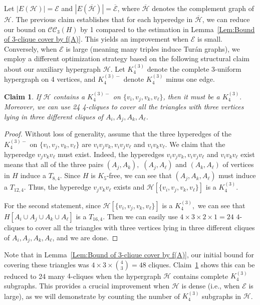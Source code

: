 \documentclass[11pt,a4paper]{article}
\newtheorem{clm}[dfn]{Claim}
\newcommand{\dH}{{\mathcal{H}}}
\newcommand{\dE}{{\mathcal{E}}}
\newcommand{\turangraph}[2]{T_{#1,#2}}
\newcommand{\coveropt}[2]{{\mathcal{C}\mathcal{C}_{#1}(#2)}}
\begin{document}
Let $|E(\dH)|=\dE$ and $|E(\overline{\dH})|=\overline{\dE}$, where $\overline{\dH}$ denotes the complement graph of $\dH.$
The previous claim establishes that for each hyperedge in $\overline{\mathcal{H}}$, we can reduce our bound on $\coveropt{3}{H}$ by 1 compared to the estimation in Lemma~\ref{Lem:Bound of 3-clique cover by f(A)}. 
This yields an improvement when $\dE$ is small.
Conversely, when $\dE$ is large (meaning many triples induce Tur\'an graphs), we employ a different optimization strategy based on the following structural claim about our auxiliary hypergraph $\mathcal{H}$. 
Let $K_4^{(3)}$ denote the complete 3-uniform hypergraph on 4 vertices, and $K_4^{(3)-}$ denote $K_4^{(3)}$ minus one edge.
\begin{clm}\label{Clm:K4(3)-}
	If $\dH$ contains a $K_{4}^{(3)-}$ on $\{v_i,v_j,v_k,v_\ell\}$, then it must be a $K_{4}^{(3)}.$
    Moreover, we can use 24 4-cliques to cover all the triangles with three vertices lying in three different cliques of $A_i, A_j, A_k, A_\ell$.
\end{clm}
\begin{proof}
	Without loss of generality, assume that the three hyperedges of the $K_{4}^{(3)-}$ on $\{v_i,v_j,v_k,v_\ell\}$ are $v_iv_jv_k, v_iv_jv_\ell$ and $v_iv_kv_\ell.$
	We claim that the hyperedge $v_jv_kv_\ell$ must exist.
	Indeed, the hyperedges $v_iv_jv_k, v_iv_jv_\ell$ and $v_iv_kv_\ell$ exist
	means that all of the three pairs $(A_j,A_k),$ $(A_j,A_\ell)$ and $(A_k,A_\ell)$ of vertices in $H$ induce a $\turangraph{8}{4}.$
	Since $H$ is $K_5$-free, we can see that $(A_j,A_k,A_\ell)$ must induce a $\turangraph{12}{4}.$
	Thus, the hyperedge $v_jv_kv_\ell$ exists and $\dH[\{v_i,v_j,v_k,v_\ell\}]$ is a $K_{4}^{(3)}.$

    For the second statement, since $\dH[\{v_i,v_j,v_k,v_\ell\}]$ is a $K_{4}^{(3)},$ 
    we can see that $H[A_i\cup A_j\cup A_k\cup A_\ell]$ is a $\turangraph{16}{4}.$  
    Then we can easily use $4\times3\times2\times1=24$ $4$-cliques to cover all the triangles with three vertices lying in three different cliques of $A_i, A_j, A_k, A_\ell$, and we are done.
\end{proof}

Note that in Lemma~\ref{Lem:Bound of 3-clique cover by f(A)}, our initial bound for covering these triangles was $4 \times 3 \times \binom{4}{3} = 48$ cliques. 
Claim~\ref{Clm:K4(3)-} shows this can be reduced to 24 many $4$-cliques when the hypergraph $\mathcal{H}$ contains complete $K_4^{(3)}$ subgraphs. 
This provides a crucial improvement when $\mathcal{H}$ is dense (i.e., when $\dE$ is large), as we will demonstrate by counting the number of $K_4^{(3)}$ subgraphs in $\mathcal{H}$.
\end{document}
